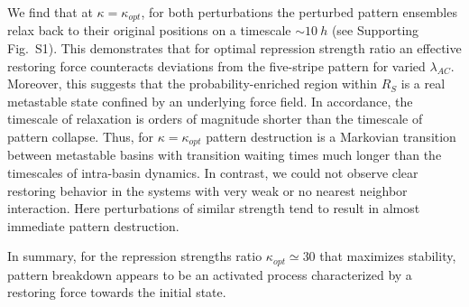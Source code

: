\documentclass[a4paper,10pt]{article}
\newcommand{\TODO}[1]{\textcolor{blue}{\textbf{($\bigstar$ #1)}}}
\begin{document}
We find that at $\kappa=\kappa_{opt}$, for both perturbations the perturbed pattern ensembles relax back to their original positions on a timescale $\sim 10~h$ (see Supporting Fig.~S1). This demonstrates that for optimal repression strength ratio an effective restoring force counteracts deviations from the five-stripe pattern for varied $\lambda_{AC}$.
Moreover, this suggests that the probability-enriched region within $R_S$ is a real metastable state confined by an underlying force field.
In accordance, the timescale of relaxation is orders of magnitude shorter than the timescale of pattern collapse.
Thus, for $\kappa=\kappa_{opt}$ pattern destruction is a Markovian transition between metastable basins with transition waiting times much longer than the timescales of intra-basin dynamics.
In contrast, we could not observe clear restoring behavior in the systems with very weak or no nearest neighbor interaction.
Here perturbations of similar strength tend to result in almost immediate pattern destruction.

In summary, for the repression strengths ratio $\kappa_{opt}\simeq30$ that maximizes stability, pattern breakdown appears to be an activated process characterized by a restoring force towards the initial state.
\end{document}
